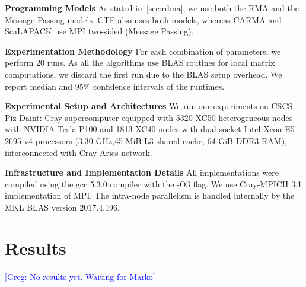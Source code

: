 \documentclass[sigplan,review,anonymous,10pt]{acmart}\settopmatter{printfolios=true,printccs=false,printacmref=false}
\newcommand\greg[1]{\textcolor{blue}{[Greg: #1]}}
\newcommand\mac[1]{\textcolor{red}{[Mac: #1]}}
\newcommand{\macb}[1]{\textbf{\textsf{#1}}}
\begin{document}
\macb{Programming Models}
%
As stated in~\cref{sec:rdma}, we use both the RMA and the Message Passing 
models. CTF also uses both models, whereas CARMA and ScaLAPACK use MPI 
two-sided (Message Passing).

\macb{Experimentation Methodology}
%
For each combination of parameters, we perform 20 runs. As all the algorithms 
use BLAS routines for local matrix computations, we discard the first run due 
to the BLAS setup overhead. We report median and 95\% confidence intervals of 
the runtimes.

\macb{Experimental Setup and Architectures}
%
We run our experiments on CSCS Piz Daint: Cray supercomputer equipped with
5320 XC50 heterogeneous nodes with NVIDIA Tesla P100 and 1813 XC40 nodes with
dual-socket Intel Xeon E5-2695 v4 processors (3.30 GHz,45 MiB L3 shared cache, 
64 GiB DDR3 RAM),
interconnected with Cray Aries network.

\macb{Infrastructure and Implementation Details}
%
All implementations were compiled using the gcc 5.3.0 compiler with the -O3 
flag. We use 
Cray-MPICH 3.1 implementation of MPI. The intra-node parallelism is handled 
internally by the MKL BLAS version 2017.4.196. 

\section{Results}
\label{sec:results}
\greg{No results yet. Waiting for Marko}



\end{document}
